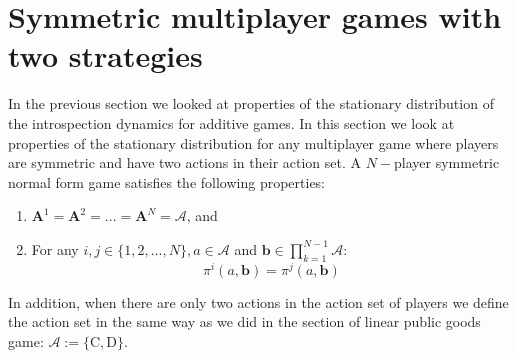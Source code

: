 \documentclass[11pt]{article}
\theoremstyle{plainCl1}
\theoremstyle{plainCl2}
\newcommand{\A}{\mathbf{A}}
\newcommand{\C}{\mathrm{C}}
\newcommand{\D}{\mathrm{D}}
\begin{document}
\section*{Symmetric multiplayer games with two strategies}

In the previous section we looked at properties of the stationary distribution of the introspection dynamics for additive games. In this section we look at properties of the stationary distribution for any multiplayer game where players are symmetric and have two actions in their action set. A $N-$player symmetric normal form game satisfies the following properties: 

\begin{enumerate}
\item $\A^1 = \A^2 = ... = \A^N = \mathcal{A}$, and
\item For any $i, j \in \{1,2,...,N\}, a \in \mathcal{A}$ and $\mathbf{b} \in \displaystyle \prod_{k=1}^{N-1} \mathcal{A}$: 
\begin{equation}
\pi^i(a, \mathbf{b}) = \pi^j(a, \mathbf{b})
\end{equation}
\end{enumerate}

\noindent In addition, when there are only two actions in the action set of players we define the action set in the same way as we did in the section of linear public goods game: $\mathcal{A} := \{\C, \D\}$. 
\end{document}

